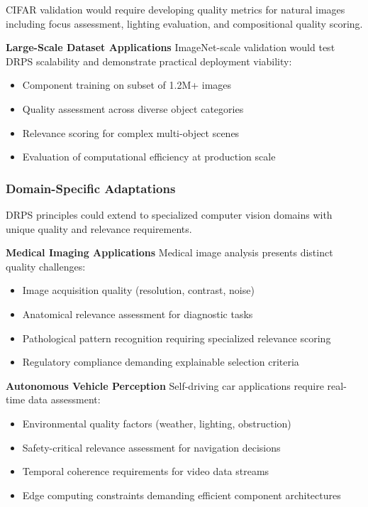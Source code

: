 \documentclass[12pt]{article}
\begin{document}
CIFAR validation would require developing quality metrics for natural images including focus assessment, lighting evaluation, and compositional quality scoring.

\textbf{Large-Scale Dataset Applications}
ImageNet-scale validation would test DRPS scalability and demonstrate practical deployment viability:
\begin{itemize}
\item Component training on subset of 1.2M+ images
\item Quality assessment across diverse object categories
\item Relevance scoring for complex multi-object scenes
\item Evaluation of computational efficiency at production scale
\end{itemize}

\subsubsection{Domain-Specific Adaptations}\label{domain-adaptations}

DRPS principles could extend to specialized computer vision domains with unique quality and relevance requirements.

\textbf{Medical Imaging Applications}
Medical image analysis presents distinct quality challenges:
\begin{itemize}
\item Image acquisition quality (resolution, contrast, noise)
\item Anatomical relevance assessment for diagnostic tasks
\item Pathological pattern recognition requiring specialized relevance scoring
\item Regulatory compliance demanding explainable selection criteria
\end{itemize}

\textbf{Autonomous Vehicle Perception}
Self-driving car applications require real-time data assessment:
\begin{itemize}
\item Environmental quality factors (weather, lighting, obstruction)
\item Safety-critical relevance assessment for navigation decisions
\item Temporal coherence requirements for video data streams
\item Edge computing constraints demanding efficient component architectures
\end{itemize}
\end{document}
